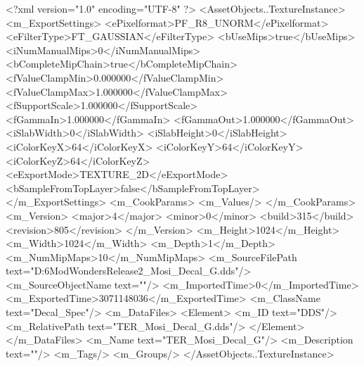 <?xml version="1.0" encoding="UTF-8" ?>
<AssetObjects..TextureInstance>
	<m_ExportSettings>
		<ePixelformat>PF_R8_UNORM</ePixelformat>
		<eFilterType>FT_GAUSSIAN</eFilterType>
		<bUseMips>true</bUseMips>
		<iNumManualMips>0</iNumManualMips>
		<bCompleteMipChain>true</bCompleteMipChain>
		<fValueClampMin>0.000000</fValueClampMin>
		<fValueClampMax>1.000000</fValueClampMax>
		<fSupportScale>1.000000</fSupportScale>
		<fGammaIn>1.000000</fGammaIn>
		<fGammaOut>1.000000</fGammaOut>
		<iSlabWidth>0</iSlabWidth>
		<iSlabHeight>0</iSlabHeight>
		<iColorKeyX>64</iColorKeyX>
		<iColorKeyY>64</iColorKeyY>
		<iColorKeyZ>64</iColorKeyZ>
		<eExportMode>TEXTURE_2D</eExportMode>
		<bSampleFromTopLayer>false</bSampleFromTopLayer>
	</m_ExportSettings>
	<m_CookParams>
		<m_Values/>
	</m_CookParams>
	<m_Version>
		<major>4</major>
		<minor>0</minor>
		<build>315</build>
		<revision>805</revision>
	</m_Version>
	<m_Height>1024</m_Height>
	<m_Width>1024</m_Width>
	<m_Depth>1</m_Depth>
	<m_NumMipMaps>10</m_NumMipMaps>
	<m_SourceFilePath text="D:\Civ6Mod\Terrain\NW\Natural Wonders\TM Release2\VictoriaFalls\MarshTextures\TER_Mosi_Decal_G.dds"/>
	<m_SourceObjectName text=""/>
	<m_ImportedTime>0</m_ImportedTime>
	<m_ExportedTime>3071148036</m_ExportedTime>
	<m_ClassName text="Decal_Spec"/>
	<m_DataFiles>
		<Element>
			<m_ID text="DDS"/>
			<m_RelativePath text="TER_Mosi_Decal_G.dds"/>
		</Element>
	</m_DataFiles>
	<m_Name text="TER_Mosi_Decal_G"/>
	<m_Description text=""/>
	<m_Tags/>
	<m_Groups/>
</AssetObjects..TextureInstance>


